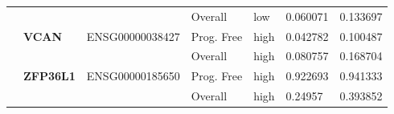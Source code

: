 \begin{spacing}{1}
{\begin{longtable}{%
            |>{\bfseries}p{2cm}|
            >{\bfseries}p{1.9cm}|
            >{\tiny}p{1.9cm}|
            p{2cm}|
            p{2cm}|
            p{1.5cm}|
            p{1.5cm}|
            }
            \hhline{~~~----}
             &          &                 & Overall    & low  & 0.060071 & 0.133697 \\
            \hhline{~======}
             & VCAN     & ENSG00000038427 & Prog. Free & high & 0.042782 & 0.100487 \\
            \hhline{~~~----}
             &          &                 & Overall    & high & 0.080757 & 0.168704 \\
            \hhline{~======}
             & ZFP36L1  & ENSG00000185650 & Prog. Free & high & 0.922693 & 0.941333 \\
            \hhline{~~~----}
             &          &                 & Overall    & high & 0.24957  & 0.393852 \\
        \end{longtable}
    }
\end{spacing}

\newpage


